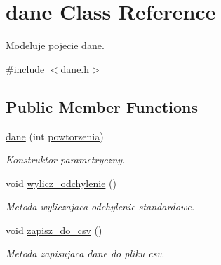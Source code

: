 \hypertarget{classdane}{\section{dane Class Reference}
\label{classdane}
}


Modeluje pojecie dane.  




{\ttfamily \#include $<$dane.\-h$>$}

\subsection*{Public Member Functions}
\begin{DoxyCompactItemize}
\item 
\hyperlink{classdane_aa74e7fb3542aa856cf6e36d5cd9a4db9}{dane} (int \hyperlink{classdane_a77efb8d7494e984418802f6e7cc32d20}{powtorzenia})
\begin{DoxyCompactList}\small\item\em Konstruktor parametryczny. \end{DoxyCompactList}\item 
void \hyperlink{classdane_a365e299198fea0ee26fe080de6b0d12e}{wylicz\-\_\-odchylenie} ()
\begin{DoxyCompactList}\small\item\em Metoda wyliczajaca odchylenie standardowe. \end{DoxyCompactList}\item 
void \hyperlink{classdane_a8427efc3e40d63911205b297aecb4ca9}{zapisz\-\_\-do\-\_\-csv} ()
\begin{DoxyCompactList}\small\item\em Metoda zapisujaca dane do pliku csv. \end{DoxyCompactList}\end{DoxyCompactItemize}
